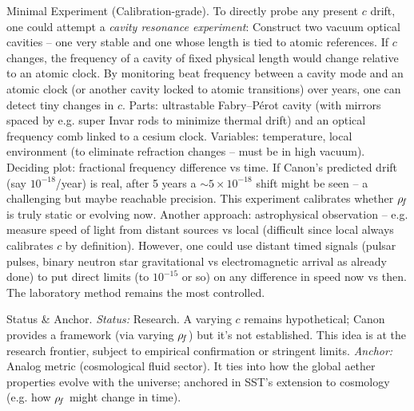 \documentclass[11pt]{article}
\begin{document}
Minimal Experiment (Calibration-grade). To directly probe any present $c$ drift, one could attempt a \textit{cavity resonance experiment}: Construct two vacuum optical cavities – one very stable and one whose length is tied to atomic references. If $c$ changes, the frequency of a cavity of fixed physical length would change relative to an atomic clock. By monitoring beat frequency between a cavity mode and an atomic clock (or another cavity locked to atomic transitions) over years, one can detect tiny changes in $c$. Parts: ultrastable Fabry–Pérot cavity (with mirrors spaced by e.g. super Invar rods to minimize thermal drift) and an optical frequency comb linked to a cesium clock. Variables: temperature, local environment (to eliminate refraction changes – must be in high vacuum). Deciding plot: fractional frequency difference vs time. If Canon’s predicted drift (say $10^{-18}$/year) is real, after 5 years a $\sim5\times10^{-18}$ shift might be seen – a challenging but maybe reachable precision. This experiment calibrates whether $\rho_{\!f}$ is truly static or evolving now. Another approach: astrophysical observation – e.g. measure speed of light from distant sources vs local (difficult since local always calibrates $c$ by definition). However, one could use distant timed signals (pulsar pulses, binary neutron star gravitational vs electromagnetic arrival as already done) to put direct limits (to $10^{-15}$ or so) on any difference in speed now vs then. The laboratory method remains the most controlled.


Status & Anchor. \textit{Status:} Research. A varying $c$ remains hypothetical; Canon provides a framework (via varying $\rho_{\!f}$) but it’s not established. This idea is at the research frontier, subject to empirical confirmation or stringent limits. \textit{Anchor:} Analog metric (cosmological fluid sector). It ties into how the global aether properties evolve with the universe; anchored in SST’s extension to cosmology (e.g. how $\rho_{\!f}$ might change in time).
\end{document}
